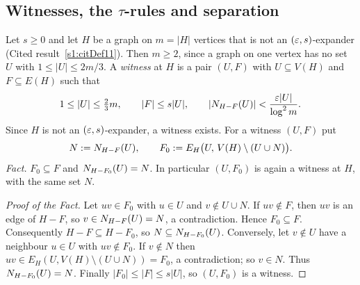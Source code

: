 \subsection{Witnesses, the \texorpdfstring{$\tau$}{tau}-rules and separation}

\begin{definition}\label{s2:defWitness}
Let $s\ge0$ and let $H$ be a graph on $m=|H|$ vertices that is not an
$(\varepsilon,s)$-expander (Cited result~\ref{s1:citDef11}). Then $m\ge2$, since a
graph on one vertex has no set $U$ with $1\le|U|\le2m/3$. A \emph{witness} at
$H$ is a pair $(U,F)$ with $U\subseteq V(H)$ and $F\subseteq E(H)$ such that
\[
1\le|U|\le\tfrac23m,\qquad |F|\le s|U|,\qquad
|N_{H-F}(U)|<\frac{\varepsilon|U|}{\log^2m}.
\]
Since $H$ is not an $(\varepsilon,s)$-expander, a witness exists. For a witness
$(U,F)$ put
\[
N\mathrel{:=}N_{H-F}(U),\qquad F_0\mathrel{:=} E_H\bigl(U,\,V(H)\setminus(U\cup
N)\bigr).
\]
\emph{Fact.} $F_0\subseteq F$ and $N_{H-F_0}(U)=N$. In particular
$(U,F_0)$ is again a witness at $H$, with the same set $N$.
\deps{\ref{s1:citDef11}, \ref{s1:defConstants}}
\end{definition}

\begin{proof}[Proof of the Fact]
Let $uv\in F_0$ with $u\in U$ and $v\notin U\cup N$. If $uv\notin F$, then
$uv$ is an edge of $H-F$, so $v\in N_{H-F}(U)=N$, a contradiction. Hence
$F_0\subseteq F$. Consequently $H-F\subseteq H-F_0$, so
$N\subseteq N_{H-F_0}(U)$. Conversely, let $v\notin U$ have a neighbour
$u\in U$ with $uv\notin F_0$. If $v\notin N$ then $uv\in
E_H(U,V(H)\setminus(U\cup N))=F_0$, a contradiction; so $v\in N$. Thus
$N_{H-F_0}(U)=N$. Finally $|F_0|\le|F|\le s|U|$, so $(U,F_0)$ is a witness.
\end{proof}

